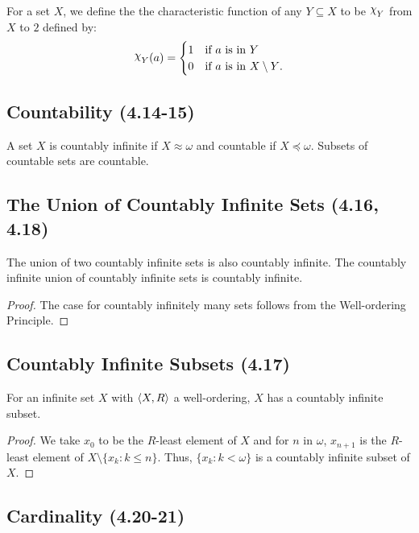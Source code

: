 For a set $X$, we define the the characteristic function of any $Y \subseteq X$
to be $\varchi_Y$ from $X$ to $2$ defined by: \begin{align*}
    \varchi_Y(a) = \begin{cases}
        1 & \text{if $a$ is in $Y$} \\
        0 & \text{if $a$ is in $X \setminus Y$}.
    \end{cases}
\end{align*}

\subsection{Countability (4.14-15)} \label{4.14} \label{4.15}

A set $X$ is countably infinite if $X \approx \omega$ and countable if 
$X \preceq \omega$. Subsets of countable sets are countable.

\subsection{The Union of Countably Infinite Sets (4.16, 4.18)} \label{4.16} \label{4.18}

The union of two countably infinite sets is also countably infinite.
The countably infinite union of countably infinite sets is countably infinite.

\begin{proof}
    The case for countably infinitely many sets follows from the Well-ordering
    Principle.
\end{proof}

\subsection{Countably Infinite Subsets (4.17)} \label{4.17}

For an infinite set $X$ with ${\langle X, R \rangle}$ a well-ordering, $X$ has a
countably infinite subset.

\begin{proof}
    We take $x_0$ to be the $R$-least element of $X$ and
    for $n$ in $\omega$, $x_{n + 1}$ is the $R$-least element of
    $X \setminus \{x_k : k \leq n\}$. Thus, $\{x_k : k < \omega\}$
    is a countably infinite subset of $X$.
\end{proof}

\subsection{Cardinality (4.20-21)} \label{4.20} \label{4.21}

